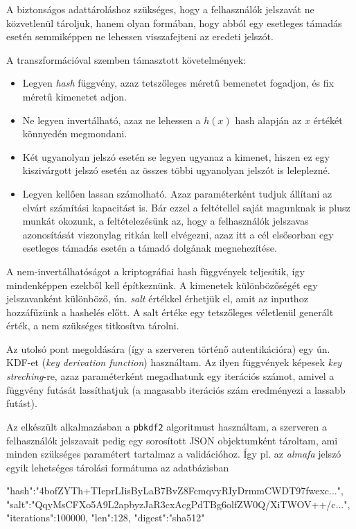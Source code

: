 A biztonságos adattároláshoz szükséges, hogy a felhasználók jelszavát ne
közvetlenül tároljuk, hanem olyan formában, hogy abból egy esetleges támadás
esetén semmiképpen ne lehessen visszafejteni az eredeti jelszót.

A transzformációval szemben támasztott követelmények:

\begin{itemize}
  \item Legyen \emph{hash} függvény, azaz tetszőleges méretű bemenetet fogadjon,
    és fix méretű kimenetet adjon.
  \item Ne legyen invertálható, azaz ne lehessen a $h(x)$ hash alapján az $x$
    értékét könnyedén megmondani.
  \item Két ugyanolyan jelszó esetén se legyen ugyanaz a kimenet, hiszen ez egy
    kiszivárgott jelszó esetén az összes többi ugyanolyan jelszót is leleplezné.
  \item Legyen kellően lassan számolható. Azaz paraméterként tudjuk állítani az
    elvárt számítási kapacitást is. Bár ezzel a feltétellel saját magunknak is
    plusz munkát okozunk, a feltételezésünk az, hogy a felhasználók jelszavas
    azonosítását viszonylag ritkán kell elvégezni, azaz itt a cél elsősorban egy
    esetleges támadás esetén a támadó dolgának megnehezítése.
\end{itemize}

A nem-invertálhatóságot a kriptográfiai hash függvények teljesítik, így
mindenképpen ezekből kell építkeznünk. A kimenetek különbözőségét egy
jelszavanként különböző, ún. \emph{salt} értékkel érhetjük el, amit az inputhoz
hozzáfűzünk a hashelés előtt. A salt értéke egy tetszőleges véletlenül generált
érték, a nem szükséges titkosítva tárolni.

Az utolsó pont megoldására (így a szerveren történő autentikációra) egy ún.
KDF-et (\emph{key derivation function}) használtam. Az ilyen függvények képesek
\emph{key streching}-re, azaz paraméterként megadhatunk egy iterációs számot,
amivel a függvény futását lassíthatjuk (a magasabb iterációs szám eredményezi a
lassabb futást).

Az elkészült alkalmazásban a \texttt{pbkdf2} algoritmust használtam, a szerveren
a felhasználók jelszavait pedig egy sorosított JSON objektumként tároltam, ami
minden szükséges paramétert tartalmaz a validációhoz. Így pl. az \emph{almafa}
jelszó egyik lehetséges tárolási formátuma az adatbázisban

\begin{js}
{
  "hash":"4bofZYTh+TIeprLIisByLaB7BvZ8FcmqvyRIyDrmmCWDT97fwexc...",
  "salt":"QqyMsCFXo5A9L2apbyzJaR3cxAcgPdTBg6olfZW0Q/XiTWOV++/c...",
  "iterations":100000,
  "len":128,
  "digest":"sha512"
}
\end{js}

